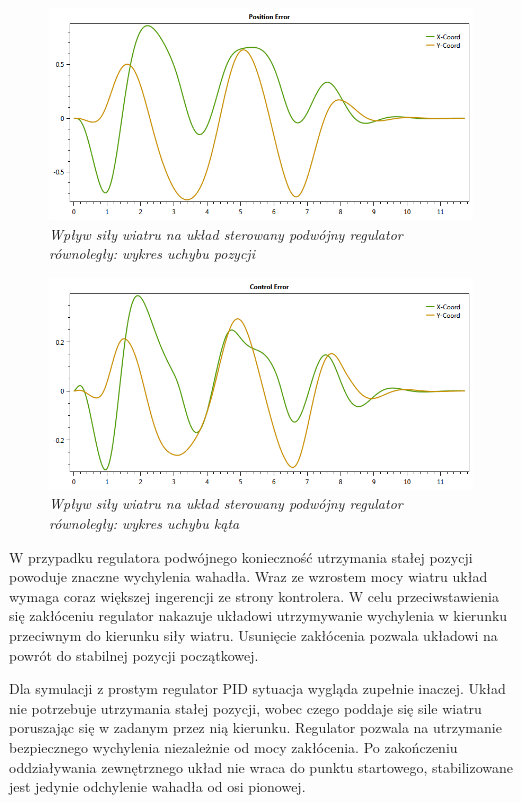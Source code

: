 \documentclass[12pt, oneside]{report}
\theoremstyle{definition}
\begin{document}
\begin{figure}[H]
	\centering
		\includegraphics[width = 320pt]{WindPDCEP} 
		\caption{\textit{Wpływ siły wiatru na układ sterowany podwójny regulator równoległy: wykres uchybu pozycji}}
		\label{plot:WindPDCEP}
\end{figure}

\begin{figure}[H]
	\centering
		\includegraphics[width = 320pt]{WindPDCEA} 
		\caption{\textit{Wpływ siły wiatru na układ sterowany podwójny regulator równoległy: wykres uchybu kąta}}
		\label{plot:WindPDCEA}
\end{figure}

W przypadku regulatora podwójnego konieczność utrzymania stałej pozycji powoduje znaczne wychylenia wahadła. Wraz ze wzrostem mocy wiatru układ wymaga coraz większej ingerencji ze strony kontrolera. W celu przeciwstawienia się zakłóceniu regulator nakazuje układowi utrzymywanie wychylenia w kierunku przeciwnym do kierunku siły wiatru. Usunięcie zakłócenia pozwala układowi na powrót do stabilnej pozycji początkowej. 

Dla symulacji z prostym regulator PID sytuacja wygląda zupełnie inaczej. Układ nie potrzebuje utrzymania stałej pozycji, wobec czego poddaje się sile wiatru poruszając się w zadanym przez nią kierunku. Regulator pozwala na utrzymanie bezpiecznego wychylenia niezależnie od mocy zakłócenia. Po zakończeniu oddziaływania zewnętrznego układ nie wraca do punktu startowego, stabilizowane jest jedynie odchylenie wahadła od osi pionowej.
\end{document}
